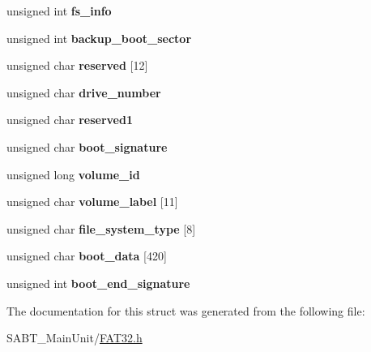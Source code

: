 \begin{DoxyCompactItemize}
\item 
\hypertarget{struct_b_s___structure_a9fd8e8ee2063e00bc67daf5eef27bb60}{unsigned int {\bfseries fs\-\_\-info}}\label{struct_b_s___structure_a9fd8e8ee2063e00bc67daf5eef27bb60}

\item 
\hypertarget{struct_b_s___structure_abf6d497078a7858297d1ea20a302e92d}{unsigned int {\bfseries backup\-\_\-boot\-\_\-sector}}\label{struct_b_s___structure_abf6d497078a7858297d1ea20a302e92d}

\item 
\hypertarget{struct_b_s___structure_a4b0e1b3a516ab2a463d3f01c11fbdc6a}{unsigned char {\bfseries reserved} \mbox{[}12\mbox{]}}\label{struct_b_s___structure_a4b0e1b3a516ab2a463d3f01c11fbdc6a}

\item 
\hypertarget{struct_b_s___structure_ace7cd596c41a03630b828ad71042c645}{unsigned char {\bfseries drive\-\_\-number}}\label{struct_b_s___structure_ace7cd596c41a03630b828ad71042c645}

\item 
\hypertarget{struct_b_s___structure_affe215a7220b2d52fb9dacf3b35e56dc}{unsigned char {\bfseries reserved1}}\label{struct_b_s___structure_affe215a7220b2d52fb9dacf3b35e56dc}

\item 
\hypertarget{struct_b_s___structure_acd0f56b390c96dd1fc27c96d932583cc}{unsigned char {\bfseries boot\-\_\-signature}}\label{struct_b_s___structure_acd0f56b390c96dd1fc27c96d932583cc}

\item 
\hypertarget{struct_b_s___structure_a83ef078c3e7d2e243682d5469ea548a3}{unsigned long {\bfseries volume\-\_\-id}}\label{struct_b_s___structure_a83ef078c3e7d2e243682d5469ea548a3}

\item 
\hypertarget{struct_b_s___structure_a209bb824f1a77b0871e9bb59ccc84497}{unsigned char {\bfseries volume\-\_\-label} \mbox{[}11\mbox{]}}\label{struct_b_s___structure_a209bb824f1a77b0871e9bb59ccc84497}

\item 
\hypertarget{struct_b_s___structure_aa0f9f93b4867fa94165dd81fec5b1aba}{unsigned char {\bfseries file\-\_\-system\-\_\-type} \mbox{[}8\mbox{]}}\label{struct_b_s___structure_aa0f9f93b4867fa94165dd81fec5b1aba}

\item 
\hypertarget{struct_b_s___structure_a59536adc9993bbe468da3161bfca6a22}{unsigned char {\bfseries boot\-\_\-data} \mbox{[}420\mbox{]}}\label{struct_b_s___structure_a59536adc9993bbe468da3161bfca6a22}

\item 
\hypertarget{struct_b_s___structure_a88c0a5625fd3caa5afa6c35ea11e9b19}{unsigned int {\bfseries boot\-\_\-end\-\_\-signature}}\label{struct_b_s___structure_a88c0a5625fd3caa5afa6c35ea11e9b19}

\end{DoxyCompactItemize}


The documentation for this struct was generated from the following file\-:\begin{DoxyCompactItemize}
\item 
S\-A\-B\-T\-\_\-\-Main\-Unit/\hyperlink{_f_a_t32_8h}{F\-A\-T32.\-h}\end{DoxyCompactItemize}
